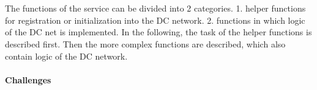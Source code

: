 \\

\\ The functions of the service can be divided into 2 categories. 1. helper functions for registration or initialization into the DC network. 2. functions in which logic of the DC net is implemented. In the following, the task of the helper functions is described first. Then the more complex functions are described, which also contain logic of the DC network.
\\
\\
\textbf{Challenges}
\\
\\



\cleardoublepage